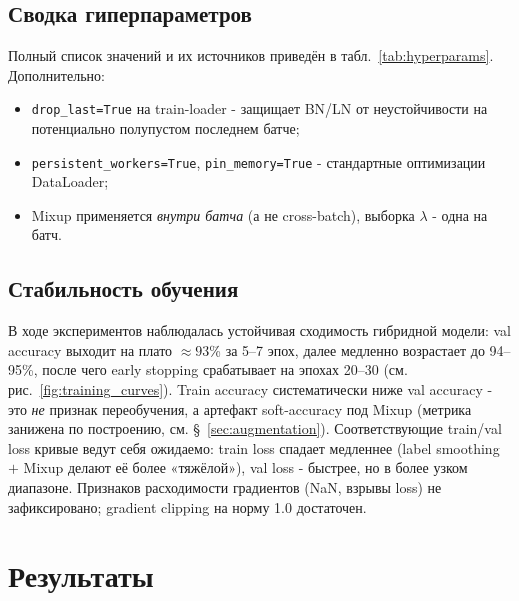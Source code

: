 \documentclass[14pt,a4paper]{extreport}
\begin{document}
\subsection{Сводка гиперпараметров}

Полный список значений и их источников приведён в
табл.~\ref{tab:hyperparams}. Дополнительно:
\begin{itemize}
    \item \texttt{drop\_last=True} на train-loader - защищает BN/LN от
          неустойчивости на потенциально полупустом последнем батче;
    \item \texttt{persistent\_workers=True}, \texttt{pin\_memory=True}
          - стандартные оптимизации DataLoader;
    \item Mixup применяется \textit{внутри батча} (а не cross-batch),
          выборка $\lambda$ - одна на батч.
\end{itemize}

\subsection{Стабильность обучения}

В ходе экспериментов наблюдалась устойчивая сходимость гибридной модели:
val accuracy выходит на плато $\approx 93$\% за 5--7 эпох, далее
медленно возрастает до 94--95\%, после чего early stopping срабатывает
на эпохах 20--30 (см. рис.~\ref{fig:training_curves}). Train accuracy
систематически ниже val accuracy - это \textit{не} признак
переобучения, а артефакт soft-accuracy под Mixup (метрика занижена по
построению, см. \S~\ref{sec:augmentation}). Соответствующие train/val
loss кривые ведут себя ожидаемо: train loss спадает медленнее (label
smoothing $+$ Mixup делают её более «тяжёлой»), val loss - быстрее,
но в более узком диапазоне. Признаков расходимости градиентов (NaN,
взрывы loss) не зафиксировано; gradient clipping на норму 1.0
достаточен.

\section{Результаты}
\end{document}

